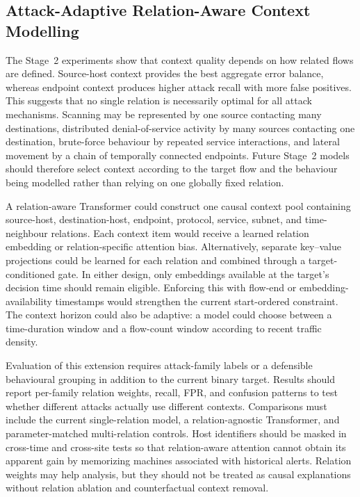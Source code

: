 \documentclass[11pt,fleqn]{report}
\begin{document}
\subsection{Attack-Adaptive Relation-Aware Context Modelling}
\label{subsubsec:future_relation_aware_context}

The Stage~2 experiments show that context quality depends on how related flows
are defined. Source-host context provides the best aggregate error balance,
whereas endpoint context produces higher attack recall with more false
positives. This suggests that no single relation is necessarily optimal for all
attack mechanisms. Scanning may be represented by one source contacting many
destinations, distributed denial-of-service activity by many sources contacting
one destination, brute-force behaviour by repeated service interactions, and
lateral movement by a chain of temporally connected endpoints. Future Stage~2
models should therefore select context according to the target flow and the
behaviour being modelled rather than relying on one globally fixed relation.

A relation-aware Transformer could construct one causal context pool containing
source-host, destination-host, endpoint, protocol, service, subnet, and
time-neighbour relations. Each context item would receive a learned relation
embedding or relation-specific attention bias. Alternatively, separate
key--value projections could be learned for each relation and combined through
a target-conditioned gate. In either design, only embeddings available at the
target's decision time should remain eligible. Enforcing this with flow-end or
embedding-availability timestamps would strengthen the current start-ordered
constraint. The context horizon could also be adaptive: a model could choose
between a time-duration window and a flow-count window according to recent
traffic density.

Evaluation of this extension requires attack-family labels or a defensible
behavioural grouping in addition to the current binary target. Results should
report per-family relation weights, recall, FPR, and confusion patterns to test
whether different attacks actually use different contexts. Comparisons must
include the current single-relation model, a relation-agnostic Transformer, and
parameter-matched multi-relation controls. Host identifiers should be masked in
cross-time and cross-site tests so that relation-aware attention cannot obtain
its apparent gain by memorizing machines associated with historical alerts.
Relation weights may help analysis, but they should not be treated as causal
explanations without relation ablation and counterfactual context removal.
\end{document}
